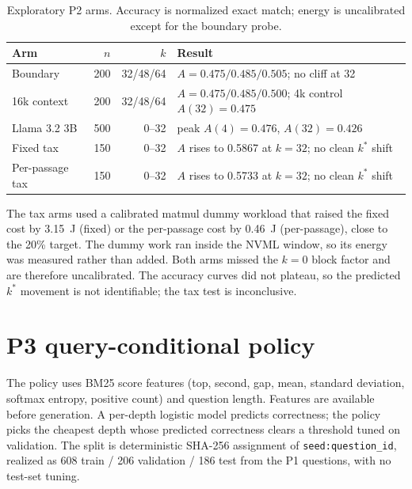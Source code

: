 \begin{table}[pos=htbp]
  \centering
  \caption{Exploratory P2 arms. Accuracy is normalized exact match; energy is
  uncalibrated except for the boundary probe.}
  \label{tab:s8explore}
  \footnotesize
  \setlength{\tabcolsep}{5pt}
  \begin{tabularx}{\textwidth}{>{\raggedright\arraybackslash}p{3.4cm}rr>{\raggedright\arraybackslash}X}
    \toprule
    \textbf{Arm} & $n$ & $k$ & \textbf{Result} \\
    \midrule
    Boundary & 200 & 32/48/64 & $A=0.475/0.485/0.505$; no cliff at 32 \\
    16k context & 200 & 32/48/64 & $A=0.475/0.485/0.500$; 4k control $A(32)=0.475$ \\
    Llama 3.2 3B & 500 & 0--32 & peak $A(4)=0.476$, $A(32)=0.426$ \\
    Fixed tax & 150 & 0--32 & $A$ rises to 0.5867 at $k=32$; no clean $k^{*}$ shift \\
    Per-passage tax & 150 & 0--32 & $A$ rises to 0.5733 at $k=32$; no clean $k^{*}$ shift \\
    \bottomrule
  \end{tabularx}
\end{table}

The tax arms used a calibrated matmul dummy workload that raised the fixed
cost by 3.15~J (fixed) or the per-passage cost by 0.46~J (per-passage), close to
the 20\% target. The dummy work ran inside the NVML window, so its energy was
measured rather than added. Both arms missed the $k=0$ block factor and are
therefore uncalibrated. The accuracy curves did not plateau, so the predicted
$k^{*}$ movement is not identifiable; the tax test is inconclusive.

\section{P3 query-conditional policy}\label{sec:s9}

The policy uses BM25 score features (top, second, gap, mean, standard deviation,
softmax entropy, positive count) and question length. Features are available
before generation. A per-depth logistic model predicts correctness; the policy
picks the cheapest depth whose predicted correctness clears a threshold tuned on
validation. The split is deterministic SHA-256 assignment of
\texttt{seed:question\_id}, realized as 608 train / 206 validation / 186 test
from the P1 questions, with no test-set tuning.


